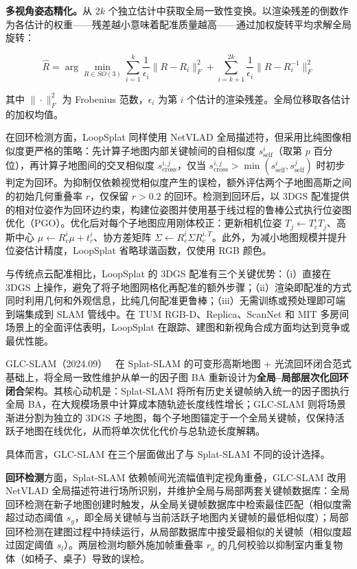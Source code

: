 \textbf{多视角姿态精化。}从 $2k$ 个独立估计中获取全局一致性变换。以渲染残差的倒数作为各估计的权重——残差越小意味着配准质量越高——通过加权旋转平均求解全局旋转：

\begin{equation}
    \hat{R} = \arg\min_{R \in SO(3)} \sum_{i=1}^{k} \frac{1}{\epsilon_i}\|R - R_i\|_F^2 + \sum_{i=k+1}^{2k} \frac{1}{\epsilon_i}\|R - R_i^{-1}\|_F^2
    \label{eq:ch15_loopsplat_rotation_averaging}
\end{equation}

其中 $\|\cdot\|_F^2$ 为 Frobenius 范数，$\epsilon_i$ 为第 $i$ 个估计的渲染残差。全局位移取各估计的加权均值。

在回环检测方面，LoopSplat 同样使用 NetVLAD 全局描述符，但采用比纯图像相似度更严格的策略：先计算子地图内部关键帧间的自相似度 $s_{\mathrm{self}}^i$（取第 $p$ 百分位），再计算子地图间的交叉相似度 $s_{\mathrm{cross}}^{i,j}$，仅当 $s_{\mathrm{cross}}^{i,j} > \min(s_{\mathrm{self}}^i, s_{\mathrm{self}}^j)$ 时初步判定为回环。为抑制仅依赖视觉相似度产生的误检，额外评估两个子地图高斯之间的初始几何重叠率 $r$，仅保留 $r > 0.2$ 的回环。检测到回环后，以 3DGS 配准提供的相对位姿作为回环边约束，构建位姿图并使用基于线过程的鲁棒公式执行位姿图优化（PGO）。优化后对每个子地图应用刚体校正：更新相机位姿 $T_j \leftarrow T_c^i T_j$、高斯中心 $\mu \leftarrow R_c^i \mu + t_c^i$、协方差矩阵 $\Sigma \leftarrow R_c^i \Sigma R_c^{i,T}$。此外，为减小地图规模并提升位姿估计精度，LoopSplat 省略球谐函数，仅使用 RGB 颜色。

与传统点云配准相比，LoopSplat 的 3DGS 配准有三个关键优势：（i）直接在 3DGS 上操作，避免了将子地图网格化再配准的额外步骤；（ii）渲染即配准的方式同时利用几何和外观信息，比纯几何配准更鲁棒；（iii）无需训练或预处理即可端到端集成到 SLAM 管线中。在 TUM RGB-D、Replica、ScanNet 和 MIT 多房间场景上的全面评估表明，LoopSplat 在跟踪、建图和新视角合成方面均达到竞争或最优性能。

GLC-SLAM（2024.09）~\cite{2409_10982} 在 Splat-SLAM 的可变形高斯地图 + 光流回环闭合范式基础上，将全局一致性维护从单一的因子图 BA 重新设计为\textbf{全局--局部层次化回环闭合}架构。其核心动机是：Splat-SLAM 将所有历史关键帧纳入统一的因子图执行全局 BA，在大规模场景中计算成本随轨迹长度线性增长；GLC-SLAM 则将场景渐进分割为独立的 3DGS 子地图，每个子地图锚定于一个全局关键帧，仅保持活跃子地图在线优化，从而将单次优化代价与总轨迹长度解耦。

具体而言，GLC-SLAM 在三个层面做出了与 Splat-SLAM 不同的设计选择。

\textbf{回环检测}方面，Splat-SLAM 依赖帧间光流幅值判定视角重叠，GLC-SLAM 改用 NetVLAD 全局描述符进行场所识别，并维护全局与局部两套关键帧数据库：全局回环检测在新子地图创建时触发，从全局关键帧数据库中检索最佳匹配（相似度需超过动态阈值 $s_g$，即全局关键帧与当前活跃子地图内关键帧的最低相似度）；局部回环检测在建图过程中持续运行，从局部数据库中接受最相似的关键帧（相似度超过固定阈值 $s_l$）。两层检测均额外施加帧重叠率 $r_o$ 的几何校验以抑制室内重复物体（如椅子、桌子）导致的误检。

